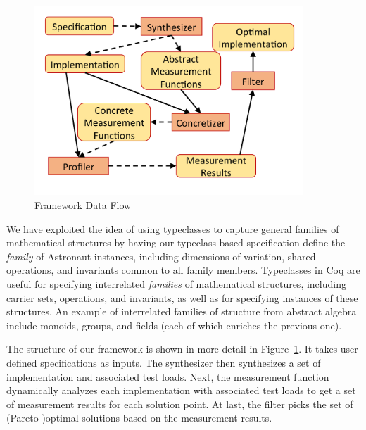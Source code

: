 \documentclass[10pt,conference]{IEEEtran}
\begin{document}
\begin{figure}[b!]
\centering
\includegraphics[width=0.9\textwidth]{img/structure}
\caption{Framework Data Flow}
\label{fig:framework_structure}
\end{figure}


We have exploited the idea of using typeclasses to capture general families of mathematical structures by having our typeclass-based specification define the {\em family} of Astronaut instances, including dimensions of variation, shared operations, and invariants common to all family members. %
Typeclasses in Coq are useful for specifying interrelated {\em families} of mathematical structures, including carrier sets, operations, and invariants, as well as for specifying instances of these structures. An example of interrelated families of structure from abstract algebra include monoids, groups, and fields (each of which enriches the previous one).

The structure of our framework is shown in more detail in Figure~\ref{fig:framework_structure}. It takes user defined specifications as inputs. The synthesizer then synthesizes a set of implementation and associated test loads. Next, the measurement function dynamically analyzes each implementation with associated test loads to get a set of measurement results for each solution point. At last, the filter picks the set of (Pareto-)optimal solutions based on the measurement results.
\end{document}
